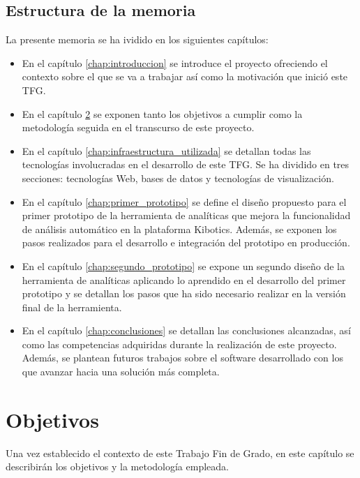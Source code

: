 \documentclass[a4paper, 12pt]{book}
\begin{document}
		
	\section{Estructura de la memoria}
	\label{sec:1_estructura_memoria}
	La presente memoria se ha ividido en los siguientes capítulos:
	
	\begin{itemize}
		\item En el capítulo \ref{chap:introduccion} se introduce el proyecto ofreciendo el contexto sobre el que se va a trabajar así como la motivación que inició este TFG.
		
		\item En el capítulo \ref{chap:objetivos} se exponen tanto los objetivos a cumplir como la metodología seguida en el transcurso de este proyecto. 
		
		\item En el capítulo \ref{chap:infraestructura_utilizada} se detallan todas las tecnologías involucradas en el desarrollo de este TFG. Se ha dividido en tres secciones: tecnologías Web, bases de datos y tecnologías de visualización. 
		
		\item En el capítulo \ref{chap:primer_prototipo} se define el diseño propuesto para el primer prototipo de la herramienta de analíticas que mejora la funcionalidad de análisis automático en la plataforma Kibotics. Además, se exponen los pasos realizados para el desarrollo e integración del prototipo en producción.
		
		\item En el capítulo \ref{chap:segundo_prototipo} se expone un segundo diseño de la herramienta de analíticas aplicando lo aprendido en el desarrollo del primer prototipo y se detallan los pasos que ha sido necesario realizar en la versión final de la herramienta.
		
		\item En el capítulo \ref{chap:conclusiones} se detallan las conclusiones alcanzadas, así como las competencias adquiridas durante la realización de este proyecto. Además, se plantean futuros trabajos sobre el software desarrollado con los que avanzar hacia una solución más completa.
		
	\end{itemize}
		
		
		
	\cleardoublepage 
	\chapter{Objetivos} 
	\label{chap:objetivos} 
		Una vez establecido el contexto de este Trabajo Fin de Grado, en este capítulo se describirán los objetivos y la metodología empleada.
\end{document}
